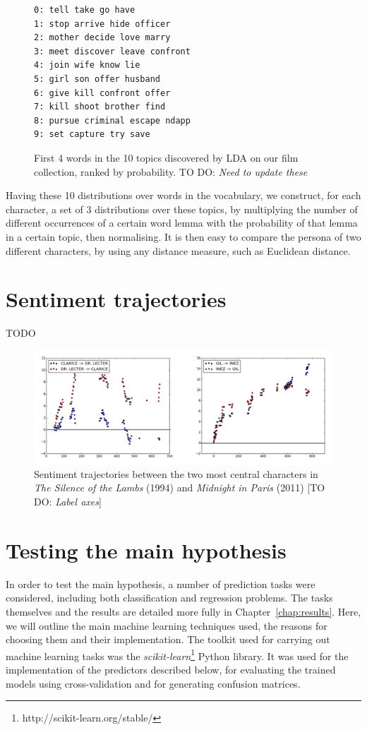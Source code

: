 \documentclass[bsc,frontabs,singlespacing,parskip, twoside]{infthesis}
\begin{document}
\begin{figure}[h]
\centering
\begin{minipage}{8cm}
\begin{Verbatim}[frame=single]
0: tell take go have 
1: stop arrive hide officer 
2: mother decide love marry 
3: meet discover leave confront 
4: join wife know lie 
5: girl son offer husband 
6: give kill confront offer
7: kill shoot brother find 
8: pursue criminal escape ndapp
9: set capture try save 
\end{Verbatim}
\end{minipage}
\caption{First 4 words in the 10 topics discovered by LDA on our film collection, ranked by probability. TO DO: \textit{Need to update these}}
\label{topics}
\end{figure}

Having these 10 distributions over words in the vocabulary, we construct, for each character, a set of 3 distributions over these topics, by multiplying the number of different occurrences of a certain word lemma with the probability of that lemma in a certain topic, then normalising. It is then easy to compare the persona of two different characters, by using any distance measure, such as Euclidean distance.


\section{Sentiment trajectories}

TODO

\begin{figure}[h!]
	\includegraphics[scale=0.335]{figures/sentiment}
	\caption{Sentiment trajectories between the two most central characters in \textit{The Silence of the Lambs} (1994) and \textit{Midnight in Paris} (2011) [TO DO: \textit{Label axes}]}
\end{figure}

\section{Testing the main hypothesis}
\label{sec:predictors}
In order to test the main hypothesis, a number of prediction tasks were considered, including both classification and regression problems. The tasks themselves and the results are detailed more fully in Chapter~\ref{chap:results}. Here, we will outline the main machine learning techniques used, the reasons for choosing them and their implementation. The toolkit used for carrying out machine learning tasks was the \textit{scikit-learn}\footnote{http://scikit-learn.org/stable/} Python library. It was used for the implementation of the predictors described below, for evaluating the trained models using cross-validation and for generating confusion matrices.
\end{document}
